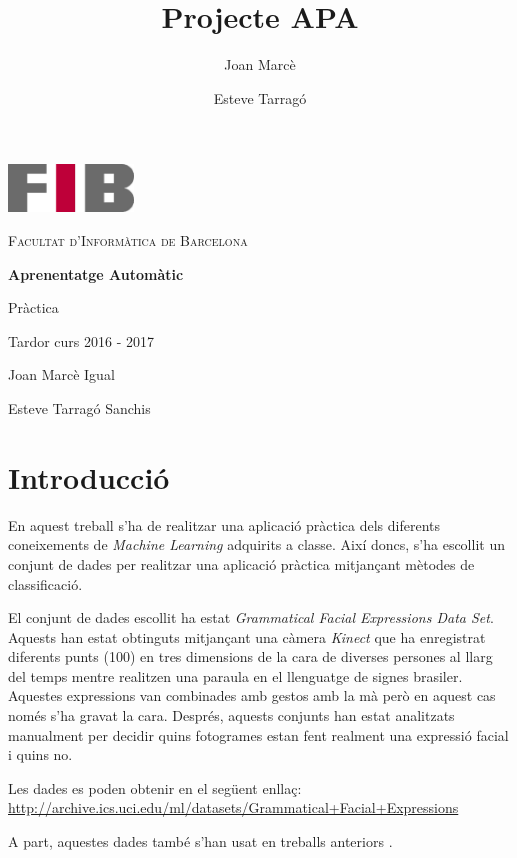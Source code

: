 \documentclass[a4paper]{article}
\title{Projecte APA}
\author{Joan Marcè \and Esteve Tarragó}
\begin{document}
\begin{titlepage}
	\centering
	\vspace{1cm}
	\includegraphics[width=0.25\textwidth]{images/logoFIB}
	\par\vspace{1cm}
	\textsc{ \LARGE Facultat d'Informàtica de Barcelona}
	\par\vspace{2cm}
	\textbf{\Huge Aprenentatge Automàtic}
	\par\vspace{2cm}
	{\LARGE Pràctica}
	\par\vspace{1em}
	{\Large Tardor curs 2016 - 2017}
	\vfill
	\begin{flushright}
		\large
		Joan Marcè Igual \par
		Esteve Tarragó Sanchis
	\end{flushright}
\end{titlepage}

\tableofcontents
\newpage

\section{Introducció}

En aquest treball s'ha de realitzar una aplicació pràctica dels diferents coneixements de \emph{Machine Learning} adquirits a classe. Així doncs, s'ha escollit un conjunt de dades per realitzar una aplicació pràctica mitjançant mètodes de classificació. 

El conjunt de dades escollit ha estat \emph{Grammatical Facial Expressions Data Set}. Aquests han estat obtinguts mitjançant una càmera \emph{Kinect} que ha enregistrat diferents punts (100) en tres dimensions de la cara de diverses persones al llarg del temps mentre realitzen una paraula en el llenguatge de signes brasiler. Aquestes expressions van combinades amb gestos amb la mà però en aquest cas només s'ha gravat la cara. Després, aquests conjunts han estat analitzats manualment per decidir quins fotogrames estan fent realment una expressió facial i quins no. 

Les dades es poden obtenir en el següent enllaç:  \url{http://archive.ics.uci.edu/ml/datasets/Grammatical+Facial+Expressions}

A part, aquestes dades també s'han usat en treballs anteriors \cite{freitas}.
\end{document}
